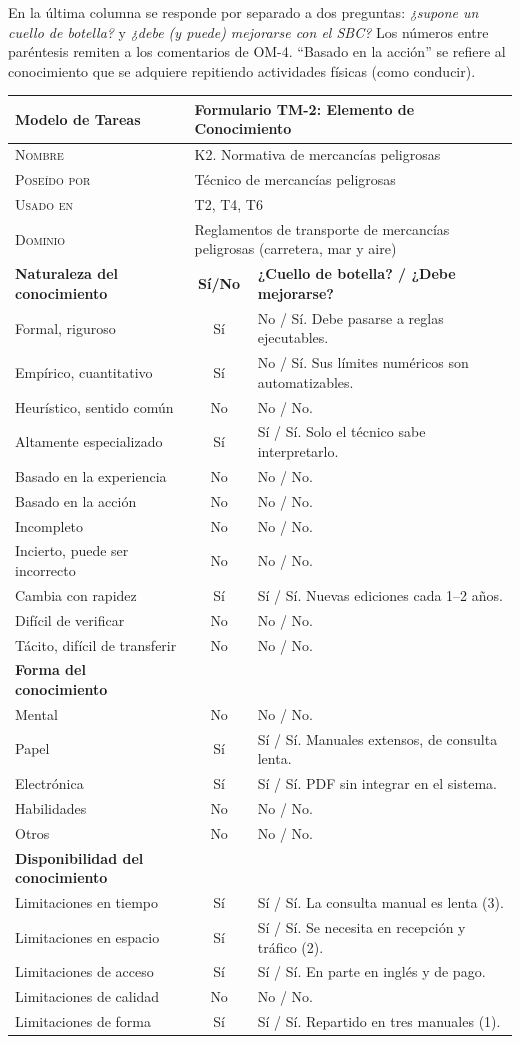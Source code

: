 \documentclass[12pt,a4paper,twoside,spanish]{article}      %
\begin{document}
En la última columna se responde por separado a dos preguntas: \textit{¿supone un cuello de botella?} y \textit{¿debe (y puede) mejorarse con el SBC?} Los números entre paréntesis remiten a los comentarios de OM-4. ``Basado en la acción'' se refiere al conocimiento que se adquiere repitiendo actividades físicas (como conducir).

\newcommand{\tmdos}[4]{\textbf{Modelo de Tareas} & \multicolumn{2}{l|}{\textbf{Formulario TM-2: Elemento de Conocimiento}} \\ \hline\hline
\textsc{Nombre} & \multicolumn{2}{l|}{#1} \\ \hline
\textsc{Poseído por} & \multicolumn{2}{l|}{#2} \\ \hline
\textsc{Usado en} & \multicolumn{2}{l|}{#3} \\ \hline
\textsc{Dominio} & \multicolumn{2}{l|}{#4} \\ \hline
\textbf{Naturaleza del conocimiento} & \textbf{Sí/No} & \textbf{¿Cuello de botella? / ¿Debe mejorarse?} \\ \hline}
\newcommand{\fila}[3]{#1 & #2 & #3 \\ \hline}
\newcommand{\bloque}[1]{\textbf{#1} & & \\ \hline}

\begin{table}[H]\scriptsize\renewcommand{\arraystretch}{0.92}
\begin{tabularx}{\textwidth}{|p{3.9cm}|c|X|} \hline
\tmdos{K2. Normativa de mercancías peligrosas}{Técnico de mercancías peligrosas}{T2, T4, T6}{Reglamentos de transporte de mercancías peligrosas (carretera, mar y aire)}
\fila{Formal, riguroso}{Sí}{No / Sí. Debe pasarse a reglas ejecutables.}
\fila{Empírico, cuantitativo}{Sí}{No / Sí. Sus límites numéricos son automatizables.}
\fila{Heurístico, sentido común}{No}{No / No.}
\fila{Altamente especializado}{Sí}{Sí / Sí. Solo el técnico sabe interpretarlo.}
\fila{Basado en la experiencia}{No}{No / No.}
\fila{Basado en la acción}{No}{No / No.}
\fila{Incompleto}{No}{No / No.}
\fila{Incierto, puede ser incorrecto}{No}{No / No.}
\fila{Cambia con rapidez}{Sí}{Sí / Sí. Nuevas ediciones cada 1--2 años.}
\fila{Difícil de verificar}{No}{No / No.}
\fila{Tácito, difícil de transferir}{No}{No / No.}
\bloque{Forma del conocimiento}
\fila{Mental}{No}{No / No.}
\fila{Papel}{Sí}{Sí / Sí. Manuales extensos, de consulta lenta.}
\fila{Electrónica}{Sí}{Sí / Sí. PDF sin integrar en el sistema.}
\fila{Habilidades}{No}{No / No.}
\fila{Otros}{No}{No / No.}
\bloque{Disponibilidad del conocimiento}
\fila{Limitaciones en tiempo}{Sí}{Sí / Sí. La consulta manual es lenta (3).}
\fila{Limitaciones en espacio}{Sí}{Sí / Sí. Se necesita en recepción y tráfico (2).}
\fila{Limitaciones de acceso}{Sí}{Sí / Sí. En parte en inglés y de pago.}
\fila{Limitaciones de calidad}{No}{No / No.}
\fila{Limitaciones de forma}{Sí}{Sí / Sí. Repartido en tres manuales (1).}
\end{tabularx}
\end{table}
\end{document}
